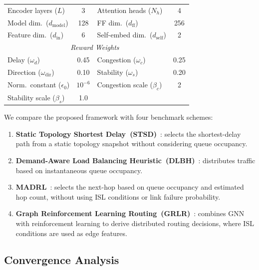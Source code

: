 \begin{table}[t]
{\begin{tabular}{lc|lc}
\midrule
Encoder layers ($L$)                  & 3         & Attention heads ($N_h$)             & 4              \\
Model dim.\ ($d_{\mathrm{model}}$)   & 128       & FF dim.\ ($d_{\mathrm{ff}}$)       & 256            \\
Feature dim.\ ($d_{\mathrm{in}}$)    & 6         & Self-embed dim.\ ($d_{\mathrm{self}}$) & 2           \\
\midrule
\multicolumn{4}{c}{\textit{Reward Weights~\cite{chen2025distributed}}} \\
\midrule
Delay ($\omega_d$) & 0.45 & Congestion ($\omega_c$) & 0.25 \\
Direction ($\omega_{\mathrm{dir}}$) & 0.10 & Stability ($\omega_s$) & 0.20 \\
Norm.\ constant ($\epsilon_0$) & $10^{-6}$ & Congestion scale ($\beta_c$) & 2 \\
Stability scale ($\beta_s$) & 1.0 & & \\
\bottomrule
\end{tabular}%
}
\end{table}

We compare the proposed framework with four benchmark schemes:
\begin{enumerate}
\item \textbf{Static Topology Shortest Delay~(STSD)}~\cite{zhang2020routing}: selects the shortest-delay path from a static topology snapshot without considering queue occupancy.
\item \textbf{Demand-Aware Load Balancing Heuristic~(DLBH)}~\cite{bhattacharjee2024demand}: distributes traffic based on instantaneous queue occupancy.
\item \textbf{MADRL}~\cite{liu2024enabling, lozano2025continual}: selects the next-hop based on queue occupancy and estimated hop count, without using ISL conditions or link failure probability.
\item \textbf{Graph Reinforcement Learning Routing~(GRLR)}~\cite{zhang2025grlr}: combines GNN with reinforcement learning to derive distributed routing decisions, where ISL conditions are used as edge features.
\end{enumerate}

\subsection{Convergence Analysis}

